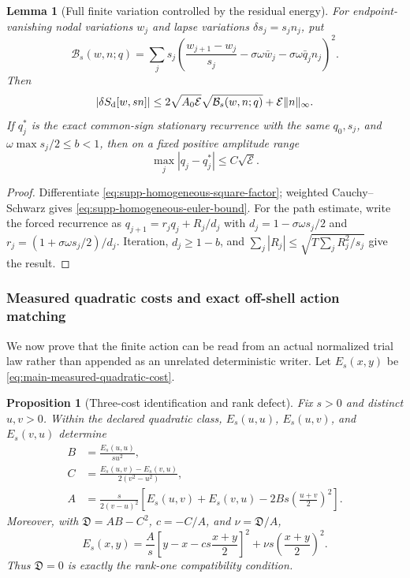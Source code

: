 \documentclass[11pt]{article}
\numberwithin{equation}{section}
\newtheorem{proposition}[proposition]{Proposition}
\newtheorem{lemma}[lemma]{Lemma}
\theoremstyle{definition}
\theoremstyle{remark}
\begin{document}
\begin{lemma}[Full finite variation controlled by the residual energy]
\label{lem:supp-homogeneous-euler-control}
For endpoint-vanishing nodal variations $w_j$ and lapse variations
$\delta s_j=s_jn_j$, put
\begin{equation}
 \mathcal B_s(w,n;q)=\sum_js_j\left(
 \frac{w_{j+1}-w_j}{s_j}-\sigma\omega\bar w_j
 -\sigma\omega\bar q_jn_j\right)^2.
 \label{eq:supp-homogeneous-variation-norm}
\end{equation}
Then
\begin{equation}
 |\delta S_{\rm d}[w,sn]|
 \le2\sqrt{A_0\mathcal E}\sqrt{\mathcal B_s(w,n;q)}
 +\mathcal E\|n\|_\infty.
 \label{eq:supp-homogeneous-euler-bound}
\end{equation}
If $q_j^*$ is the exact common-sign stationary recurrence with the same
$q_0,s_j$, and $\omega\max s_j/2\le b<1$, then on a fixed positive amplitude
range
\begin{equation}
 \max_j|q_j-q_j^*|\le C\sqrt{\mathcal E}.
 \label{eq:supp-homogeneous-path-control}
\end{equation}
\end{lemma}

\begin{proof}
Differentiate \eqref{eq:supp-homogeneous-square-factor}; weighted
Cauchy--Schwarz gives \eqref{eq:supp-homogeneous-euler-bound}.  For the path
estimate, write the forced recurrence as
$q_{j+1}=r_jq_j+R_j/d_j$ with
$d_j=1-\sigma\omega s_j/2$ and
$r_j=(1+\sigma\omega s_j/2)/d_j$.  Iteration, $d_j\ge1-b$, and
$\sum_j|R_j|\le\sqrt{T\sum_jR_j^2/s_j}$ give the result.
\end{proof}

\subsubsection{Measured quadratic costs and exact off-shell action matching}

We now prove that the finite action can be read from an actual normalized trial
law rather than appended as an unrelated deterministic writer.  Let
$E_s(x,y)$ be \eqref{eq:main-measured-quadratic-cost}.

\begin{proposition}[Three-cost identification and rank defect]
\label{prop:supp-three-costs}
Fix $s>0$ and distinct $u,v>0$.  Within the declared quadratic class,
$E_s(u,u)$, $E_s(u,v)$, and $E_s(v,u)$ determine
\begin{align}
 B&=\frac{E_s(u,u)}{su^2},\\
 C&=\frac{E_s(u,v)-E_s(v,u)}{2(v^2-u^2)},\\
 A&=\frac{s}{2(v-u)^2}\left[
 E_s(u,v)+E_s(v,u)
 -2Bs\left(\frac{u+v}{2}\right)^2\right].
 \label{eq:supp-three-cost-identification}
\end{align}
Moreover, with $\mathfrak D=AB-C^2$, $c=-C/A$, and
$\nu=\mathfrak D/A$,
\begin{equation}
 E_s(x,y)=\frac A s\left[y-x-cs\frac{x+y}{2}\right]^2
 +\nu s\left(\frac{x+y}{2}\right)^2.
 \label{eq:supp-cost-completion}
\end{equation}
Thus $\mathfrak D=0$ is exactly the rank-one compatibility condition.
\end{proposition}
\end{document}
